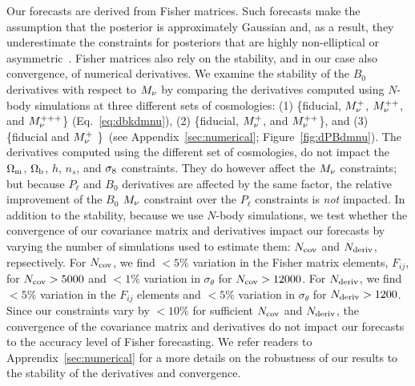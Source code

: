 Our forecasts are derived from Fisher matrices. Such forecasts make 
the assumption that the posterior is approximately Gaussian and, as a result, 
they underestimate the constraints for posteriors that are highly 
non-elliptical or asymmetric~\citep{wolz2012}. Fisher matrices also rely 
on the stability, and in our case also convergence, of numerical derivatives. 
We examine the stability of the $B_0$ derivatives with respect to $M_\nu$ 
by comparing the derivatives computed using $N$-body simulations 
at three different sets of cosmologies: (1) \{fiducial, $M_\nu^{+}$, $M_\nu^{++}$, 
and $M_\nu^{+++}$\} (Eq.~\ref{eq:dbkdmnu}), (2) \{fiducial, $M_\nu^{+}$, 
and $M_\nu^{++}$\}, and (3) \{fiducial and $M_\nu^{+}$ \}~(see Appendix~\ref{sec:numerical}; Figure~\ref{fig:dPBdmnu}). 
The derivatives computed using the different set of cosmologies, do not impact 
the $\Omega_{\rm m}$, $\Omega_{\rm b}$, $h$, $n_s$, and $\sigma_8$ constraints. They do however affect the 
$M_\nu$ constraints; but because $P_\ell$ and $B_0$ derivatives are affected by 
the same factor, the relative improvement of the $B_0$ $M_\nu$ constraint over 
the $P_\ell$ constraints is \emph{not} impacted. 
In addition to the stability, because we use $N$-body simulations, we test 
whether the convergence of our covariance matrix and derivatives impact 
our forecasts by varying the number of simulations 
used to estimate them: $N_{\rm cov}$ and $N_{\rm deriv}$, repsectively. 
For $N_{\rm cov}$, we find $< 5\%$ variation in the Fisher matrix elements, 
$F_{ij}$, for $N_{\rm cov} > 5000$ and $< 1\%$ variation in $\sigma_\theta$
for $N_{\rm cov} > 12000$.  For $N_{\rm deriv}$, we find $< 5\%$ variation 
in the $F_{ij}$ elements and $< 5\%$ variation in $\sigma_\theta$ for 
$N_{\rm deriv} > 1200$. Since our constraints vary by $< 10\%$ for sufficient 
$N_{\rm cov}$ and $N_{\rm deriv}$, the convergence of the covariance matrix 
and derivatives do not impact our forecasts to the accuracy level of Fisher 
forecasting. We refer readers to Apprendix~\ref{sec:numerical} for a more 
details on the robustness of our results to the stability of the derivatives 
and convergence. 

